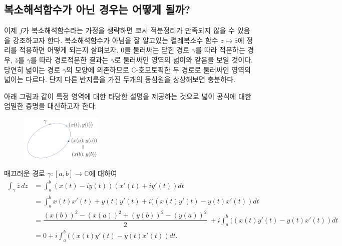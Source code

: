 \subsection{복소해석함수가 아닌 경우는 어떻게 될까?}

이제 $f$가 복소해석함수라는 가정을 생략하면 코시 적분정리가 만족되지 않을 수 있음을 강조하고자 한다.
복소해석함수가 아님을 잘 알고있는 켤레복소수 함수 $z\mapsto \bar z$에 정리를 적용하면
어떻게 되는지 살펴보자.
$0$을 둘러싸는 닫힌 경로 $\gamma$를 따라 적분하는 경우,
$\bar z$를 $\gamma$를 따라 경로적분한 결과는 $\gamma$로 둘러싸인 영역의 넓이와 
같음을 보일 것이다.
당연히 넓이는 경로 $\gamma$의 모양에 의존하므로 $\mathbb C$-호모토픽한 두 경로로
둘러싸인 영역의 넓이는 다르다. 
단지 다른 반지름을 가진 두개의 동심원을 상상해보면 충분하다.


아래 그림과 같이 특정 영역에 대한 타당한 설명을 제공하는 것으로
넓이 공식에 대한 엄밀한 증명을 대신하고자 한다. %

\begin{figure}[!h]
\begin{center}
\includegraphics[width=0.35\textwidth]{./SaltChapter/figs/fig-3-0-4}
\end{center}
\end{figure}

매끄러운 경로 $\gamma: [a,b] \to \mathbb C$에 대하여
\begin{align*}
\int_\gamma \bar z\, dz
&= \int_a^b (x(t)-iy(t))(x'(t)+iy'(t))dt \\
&= \int_a^b x(t)x'(t)+y(t)y'(t) + i((x(t)y'(t)-y(t)x'(t))dt \\
&= \dfrac{(x(b))^2-(x(a))^2 + (y(b))^2 - (y(a))^2}2\
+ i \int_a^b ((x(t)y'(t)-y(t)x'(t))dt \\
&= 0 + i \int_a^b ((x(t)y'(t)-y(t)x'(t))dt.
\end{align*}

